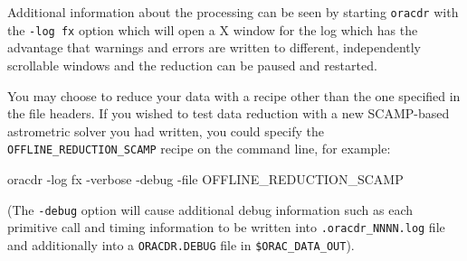 \documentclass[twoside,11pt,nolof]{starlink}
\providecommand{\GAIA}{\xref{\textsc{{Gaia}}}{sun214}{}}
\providecommand{\KAPPA}{\xref{\textsc{{Kappa}}}{sun95}{}}
\providecommand{\ORACDR}{{\footnotesize ORAC-DR}}
\providecommand{\SCAMP}{\textsc{SCAMP}}
\begin{document}
Additional information about the processing can be seen by starting
\verb+oracdr+ with the \verb+-log fx+ option which will open a X window for the
log which has the advantage that warnings and errors are written to different,
independently scrollable windows and the reduction can be paused and restarted.

%
%
%
%
%
%
You may choose to reduce your data with a recipe other than the one specified
in the file headers. If you wished to test data reduction with a new
\SCAMP-based astrometric solver you had written, you could specify the {\tt
OFFLINE\_REDUCTION\_SCAMP} recipe on the command line,
for example:

\begin{terminalv}
      oracdr -log fx -verbose -debug -file OFFLINE_REDUCTION_SCAMP
\end{terminalv}

(The \verb+-debug+ option will cause additional debug information such as each
primitive call and timing information to be written into 
\texttt{.oracdr\_NNNN.log} file and additionally into a \texttt{ORACDR.DEBUG}
file in \texttt{\$ORAC\_DATA\_OUT}).
%
%
\end{document}
